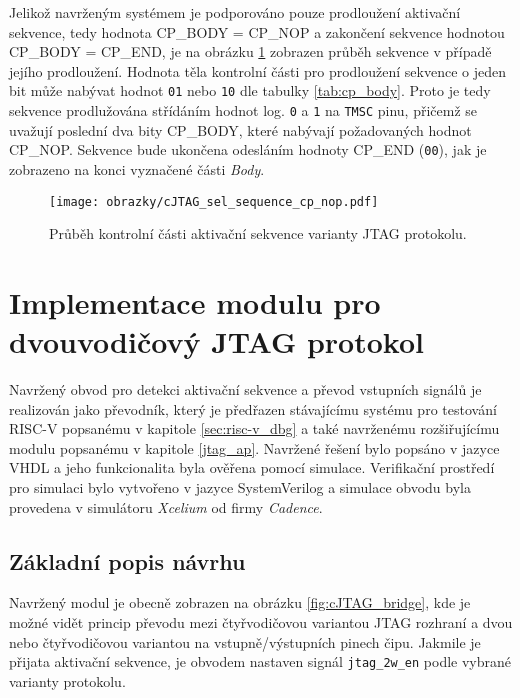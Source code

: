 Jelikož navrženým systémem je podporováno pouze prodloužení aktivační sekvence, tedy hodnota CP\_BODY = CP\_NOP a zakončení sekvence hodnotou \\CP\_BODY = CP\_END, je na obrázku \ref{fig:cJTAG_sel_cp_nop} zobrazen průběh sekvence v případě jejího prodloužení. Hodnota těla kontrolní části pro prodloužení sekvence o jeden bit může nabývat hodnot \texttt{01} nebo \texttt{10} dle tabulky \ref{tab:cp_body}. Proto je tedy sekvence prodlužována střídáním hodnot log. \texttt{0} a \texttt{1} na \texttt{\acs{TMSC}} pinu, přičemž se uvažují poslední dva bity CP\_BODY, které nabývají požadovaných hodnot CP\_NOP. Sekvence bude ukončena odesláním hodnoty CP\_END (\texttt{00}), jak je zobrazeno na konci vyznačené části \textit{Body}.

\begin{figure}[!h]
  \begin{center}
    \texttt{[image: obrazky/cJTAG\_sel\_sequence\_cp\_nop.pdf]}
  \end{center}
  \caption{Průběh kontrolní části aktivační sekvence varianty \acs{JTAG} protokolu.}
	\label{fig:cJTAG_sel_cp_nop}
\end{figure}

\section{Implementace modulu pro dvouvodičový \acs{JTAG} protokol}
Navržený obvod pro detekci aktivační sekvence a převod vstupních signálů je realizován jako převodník, který je předřazen stávajícímu systému pro testování \acs{RISC-V} popsanému v kapitole \ref{sec:risc-v_dbg} a také navrženému rozšiřujícímu modulu popsanému v kapitole \ref{jtag_ap}. Navržené řešení bylo popsáno v jazyce \acs{VHDL} a jeho funkcionalita byla ověřena pomocí simulace. Verifikační prostředí pro simulaci bylo vytvořeno v jazyce SystemVerilog a simulace obvodu byla provedena v simulátoru \textit{Xcelium} od firmy \textit{Cadence}.

\subsection{Základní popis návrhu}	\label{subsec:cJTAG_adapter}
Navržený modul je obecně zobrazen na obrázku \ref{fig:cJTAG_bridge}, kde je možné vidět princip převodu mezi čtyřvodičovou variantou \acs{JTAG} rozhraní a dvou nebo čtyřvodičovou variantou na vstupně/výstupních pinech čipu. Jakmile je přijata aktivační sekvence, je obvodem nastaven signál \texttt{jtag\_2w\_en} podle vybrané varianty protokolu.

